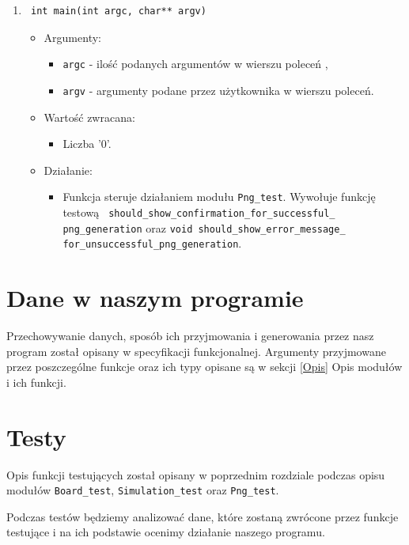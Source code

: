 \documentclass[a4paper,11pt, notitlepage ]{article}
\begin{document}
\begin{enumerate}
\item \begin{verbatim} int main(int argc, char** argv) \end{verbatim}
\begin{itemize}
\item Argumenty:
\begin{itemize}
\item \verb+argc+ - ilość podanych argumentów w wierszu poleceń ,
\item \verb+argv+ - argumenty podane przez użytkownika w wierszu poleceń.
\end{itemize}
\item Wartość zwracana:
\begin{itemize}
\item Liczba '0'.
\end{itemize}
\item Działanie:
\begin{itemize}
\item Funkcja steruje działaniem modułu \verb+Png_test+. Wywołuje funkcję testową \verb+ should_show_confirmation_for_successful_+\\\verb+png_generation+ oraz \verb+void should_show_error_message_+\\\verb+for_unsuccessful_png_generation+.
\end{itemize}
\end{itemize}


\end{enumerate}

\section{Dane w naszym programie}
Przechowywanie danych, sposób ich przyjmowania i generowania przez nasz program został opisany w specyfikacji funkcjonalnej. Argumenty przyjmowane przez poszczególne funkcje oraz ich typy opisane są w sekcji \ref{Opis} Opis modułów i ich funkcji.

\section{Testy}
Opis funkcji testujących został opisany w poprzednim rozdziale podczas opisu modułów \verb+Board_test+,
\verb+Simulation_test+ oraz \verb+Png_test+.

Podczas testów będziemy analizować dane, które zostaną zwrócone przez funkcje testujące i na ich podstawie ocenimy działanie naszego programu.
\end{document}
